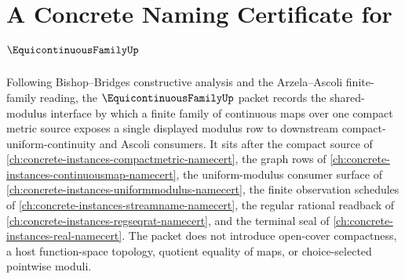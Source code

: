 \chapter{A Concrete Naming Certificate for $\EquicontinuousFamilyUp$}
\label{ch:concrete-instances-equicontinuous-family-namecert}

Following Bishop--Bridges constructive analysis and the Arzela--Ascoli finite-family reading, the $\EquicontinuousFamilyUp$ packet records the shared-modulus interface by which a finite family of continuous maps over one compact metric source exposes a single displayed modulus row to downstream compact-uniform-continuity and Ascoli consumers. It sits after the compact source of \autoref{ch:concrete-instances-compactmetric-namecert}, the graph rows of \autoref{ch:concrete-instances-continuousmap-namecert}, the uniform-modulus consumer surface of \autoref{ch:concrete-instances-uniformmodulus-namecert}, the finite observation schedules of \autoref{ch:concrete-instances-streamname-namecert}, the regular rational readback of \autoref{ch:concrete-instances-regseqrat-namecert}, and the terminal seal of \autoref{ch:concrete-instances-real-namecert}. The packet does not introduce open-cover compactness, a host function-space topology, quotient equality of maps, or choice-selected pointwise moduli.

